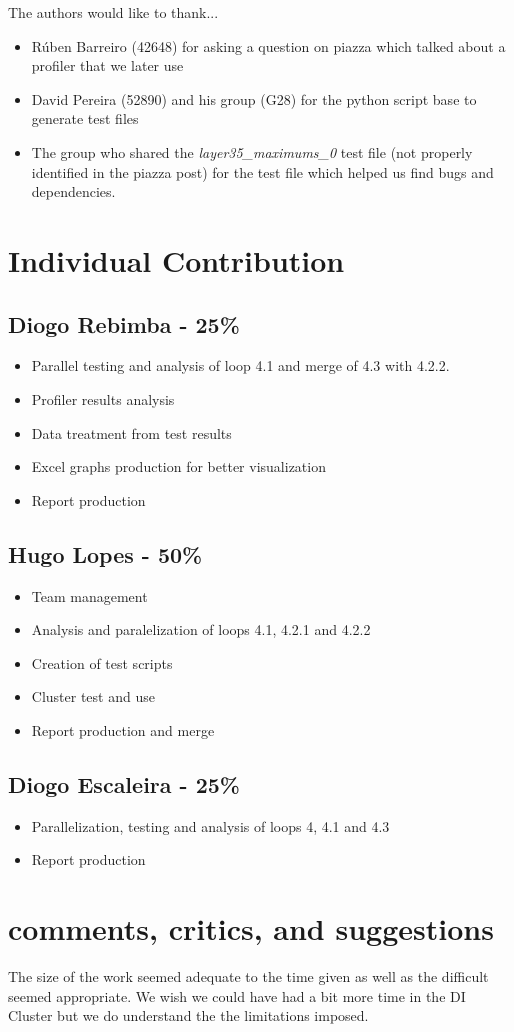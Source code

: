 \documentclass[10pt,journal,compsoc]{IEEEtran}
\begin{document}
The authors would like to thank...
\begin{itemize}
\item Rúben Barreiro (42648) for asking a question on piazza which talked about a profiler that we later use
\\
\item David Pereira (52890) and his group (G28) for the python script base to generate test files
\\
\item The group who shared the \textit{layer35\_maximums\_0} test file (not properly identified in the piazza post) for the test file which helped us find bugs and dependencies. 
\end{itemize}

\section*{Individual Contribution}
\subsection*{Diogo Rebimba - 25\%}
\begin{itemize}
\item Parallel testing and analysis of loop 4.1 and merge of 4.3 with 4.2.2.
\item Profiler results analysis
\item Data treatment from test results
\item Excel graphs production for better visualization
\item Report production
\end{itemize}

\subsection*{Hugo Lopes - 50\%}
\begin{itemize}
\item Team management
\item Analysis and paralelization of loops 4.1, 4.2.1 and 4.2.2
\item Creation of test scripts
\item Cluster test and use
\item Report production and merge
\end{itemize}

\subsection*{Diogo Escaleira - 25\%}
\begin{itemize}
\item Parallelization, testing and analysis of loops 4, 4.1 and 4.3
\item Report production
\end{itemize}

\section*{comments, critics, and suggestions}
The size of the work seemed adequate to the time given as well as the difficult seemed appropriate.
We wish we could have had a bit more time in the DI Cluster but we do understand the the limitations imposed.
\end{document}
